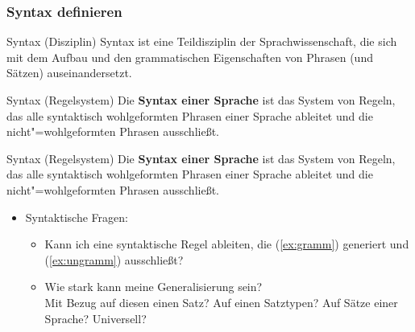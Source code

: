 \begin{frame}
\frametitle{Syntax definieren}

\begin{block}{Syntax (Disziplin)}
Syntax ist eine Teildisziplin der Sprachwissenschaft, die sich mit dem Aufbau und den grammatischen Eigenschaften von Phrasen (und Sätzen) auseinandersetzt.
\end{block}

\begin{block}{Syntax (Regelsystem)}
Die \textbf{Syntax einer Sprache} ist das System von Regeln, das alle syntaktisch wohlgeformten Phrasen einer Sprache ableitet und die nicht"=wohlgeformten Phrasen ausschließt.
\end{block}

\end{frame}






\begin{frame}

\begin{block}{Syntax (Regelsystem)}
Die \textbf{Syntax einer Sprache} ist das System von Regeln, das alle syntaktisch wohlgeformten Phrasen einer Sprache ableitet und die nicht"=wohlgeformten Phrasen ausschließt.
\end{block}

	\settowidth{}
	
	\z
	
\begin{itemize}
	\item Syntaktische Fragen:\\
	\begin{itemize}
		\item Kann ich eine syntaktische Regel ableiten, die (\ref{ex:gramm}) generiert und (\ref{ex:ungramm}) ausschließt?
		\item Wie stark kann meine Generalisierung sein?\\
		\ras Mit Bezug auf diesen einen Satz? Auf einen Satztypen? Auf Sätze einer Sprache? Universell?
	\end{itemize}

\end{itemize}

\end{frame}


